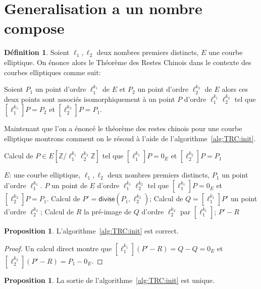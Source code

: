 \documentclass[10pt,a4paper]{book}
\theoremstyle{plain}
\theoremstyle{definition}
\theoremstyle{definition}
\theoremstyle{definition}
\newtheorem{prop}[thm]{Proposition}
\theoremstyle{definition}
\newtheorem{defi}[thm]{Définition}
\theoremstyle{remark}
\theoremstyle{remark}
\theoremstyle{definition}
\begin{document}
\section{Generalisation a un nombre compose}


\begin{defi}
Soient $\ell_1, \ell_2$ deux nombres premiers distincts, $E$ une courbe 
elliptique. On énonce alors le Théorème des Restes Chinois dans le contexte des
courbes elliptiques comme suit:

Soient $P_1$ un point d'ordre $\ell_1^{k_1}$ de $E$ et $P_2$ un point d'ordre $\ell_2^{k_2}$ de $E$ alors ces deux points sont associés isomorphiquement à un point $P$ d'ordre $\ell_1^{k_1}\ell_2^{k_2}$ tel que $[\ell_1^{k_1}]P=P_2$ et $[\ell_2^{k_2}]P=P_1$.
\end{defi}

Maintenant que l'on a énoncé le théorème des restes chinois pour une courbe elliptique montrons comment on le résoud à l'aide de l'algorithme~\ref{alg:TRC:init}.
\begin{algorithm}
\caption{\label{alg:TRC:init}Calcul de $P \in E[\mathbb{Z}/\ell_1^{k_1}\ell_2^{k_2}\mathbb{Z}]$ tel que $[\ell_1^{k_1}]P=0_E$ et $[\ell_2^{k_2}]P=P_1$}
\begin{algorithmic}[1]
\REQUIRE $E$: une courbe elliptique, $\ell_1,\ell_2$ deux nombres premiers distincts, $P_1$ un point d'ordre $\ell_1^{k_1}$.
\ENSURE $P$ un point de $E$ d'ordre $\ell_1^{k_1}\ell_2^{k_2}$  tel que $[\ell_1^{k_1}]P=0_E$ et $[\ell_2^{k_2}]P=P_1$.
\STATE \label{alg:TRC:init:div} Calcul de $P'=\mathsf{divise}(P_1,\ell_2^{k_2})$;
\STATE \label{alg:TRC:init:mul} Calcul de $Q=[\ell_1^{k_1}]P'$ un point d'ordre $\ell_2^{k_2}$;
\STATE \label{alg:TRC:init:prim} Calcul de $R$ la pré-image de $Q$ d'ordre $\ell_2^{k_2}$ par $[\ell_1^{k_1}]$;
\RETURN $P'-R$
\end{algorithmic}
\end{algorithm}

\begin{prop}
L'algorithme~\ref{alg:TRC:init} est correct.
\end{prop}

\begin{proof}
Un calcul direct montre que $[\ell_1^{k_1}](P'-R)=Q-Q=0_E$ et 
 $[\ell_2^{k_2}](P'-R)=P_1-0_E$.
\end{proof}

\begin{prop}
La sortie de l'algorithme~\ref{alg:TRC:init} est unique.
\end{prop}
\end{document}
